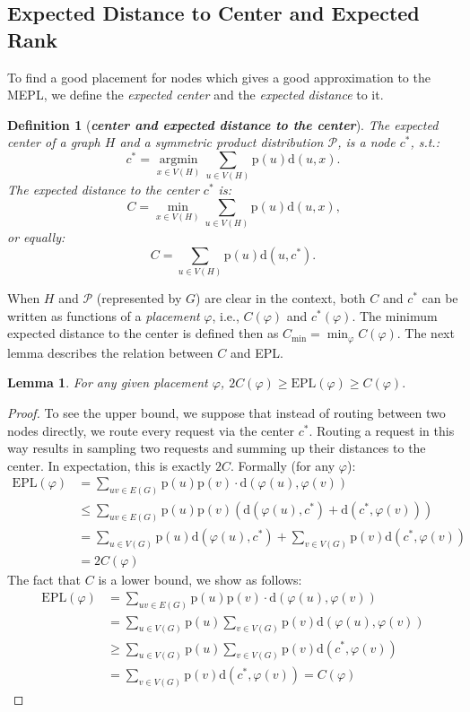 \documentclass[conference]{IEEEtran}
\def\d{\mathrm{d}}
\def\p{\mathrm{p}}
\def\Pc{\mathcal{P}}
\def\epl{\mathrm{EPL}}
\newtheorem{lemma}{Lemma}
\newtheorem{definition}{Definition}
\begin{document}
\subsection{Expected Distance to Center and Expected Rank} 
To find a good placement  for nodes which gives a good approximation to the MEPL, we define the \emph{expected center} and the \emph{expected distance} to it.
\begin{definition}[\bf \emph{center and expected distance to the center}]
The expected center of a graph $H$ and a symmetric product distribution $\Pc$, is a node $c^*$, s.t.:
$$
c^* = \underset{x \in V(H)}{\operatorname{argmin}} \sum_{u \in V(H)}\p(u)\d(u,x).
$$
The expected distance to the center $c^*$ is:
$$
C=\min_{x \in V(H)} \sum_{u \in V(H)}\p(u)\d(u,x) \text{,} 
$$
or equally:
$$
C=\sum_{u \in V(H)}\p(u)\d(u,c^*).
$$
\end{definition}
When $H$ and $\Pc$ (represented by $G$) are clear in the context, both $C$ and $c^*$ can be written as functions of a \emph{placement } $\varphi$, i.e., $C(\varphi)$ and $c^*(\varphi)$. The minimum expected distance to the center is defined then as $
C_{\min}=  \min_{\varphi} C(\varphi)
$.
The next lemma describes the relation between $C$ and EPL.
 \begin{lemma}\label{lem:epl-c}
For any given placement  $\varphi$,
$
2C(\varphi) \ge \epl(\varphi) \ge C(\varphi). 
$
\end{lemma}
\begin{proof}
To see the upper bound, we suppose that instead of routing between two nodes directly, we route every request via the center $c^*$. Routing a request in this way results in sampling two requests and summing up their distances to the center. In expectation, this is exactly $2C$. Formally (for any $\varphi$):
\begin{align*}
\epl(\varphi)&=\sum_{uv\in E(G)} \p(u) \p(v) \cdot \d(\varphi(u),\varphi(v))\\
&\le \sum_{uv\in E(G)} \p(u) \p(v) (\d(\varphi(u),c^*) +\d(c^*,\varphi(v))) \\
&=\sum_{u\in V(G)} \p(u)\d(\varphi(u),c^*)+\sum_{v\in V(G)} \p(v)\d(c^*,\varphi(v))\\
&= 2C(\varphi)
\end{align*}
The fact that $C$ is a lower bound, we show as follows:
\begin{align*}
\epl(\varphi)&=\sum_{uv\in E(G)} \p(u) \p(v) \cdot  \d(\varphi(u),\varphi(v))\\
&=\sum_{u\in V(G)} \p(u) \sum_{v\in V(G)}\p(v) \d(\varphi(u),\varphi(v))\\
&\geq \sum_{u\in V(G)} \p(u) \sum_{v\in V(G)}\p(v)  \d(c^*,\varphi(v))\\
&=\sum_{v\in V(G)}\p(v)  \d(c^*,\varphi(v))=C(\varphi)
\end{align*}
\end{proof}
\end{document}
